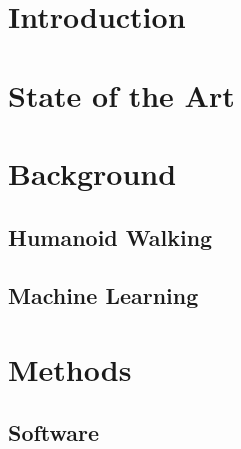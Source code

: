 \documentclass  [
  paper    = a4,
  BCOR     = 10mm,
  twoside,
  fontsize = 12pt,
  fleqn,
  toc      = bibnumbered,
  toc      = listofnumbered,
  numbers  = noendperiod,
  headings = normal,
  listof   = leveldown,
  version  = 3.03
]                                       {scrreprt}
\begin{document}
  

  \tableofcontents
  
  \chapter{Introduction}
    
  \chapter{State of the Art}
  \label{sec::2_sota}
    
  \chapter{Background}
  \section{Humanoid Walking}
  \label{sec::31_hm}
  
  \section{Machine Learning}  
  \label{sec::32_ml}
   
  \chapter{Methods}
  \section{Software}
  
\end{document}
